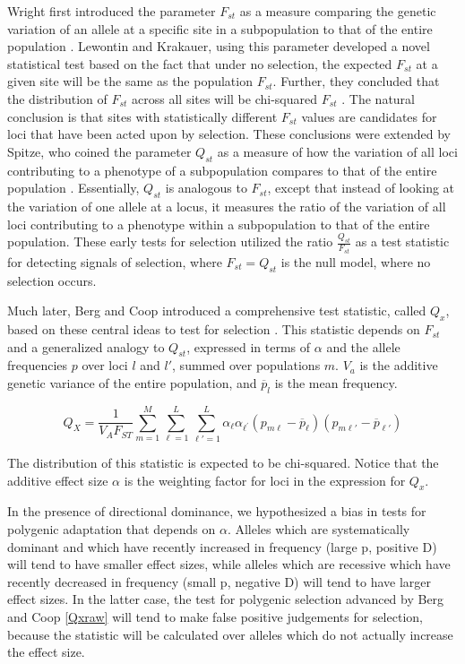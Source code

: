 \documentclass[a4paper,11pt]{article}
\begin{document}
Wright first introduced the parameter $F_{st}$ as a measure comparing
the genetic variation of an allele at a specific site in a subpopulation to that of the entire population
\cite{Fst}. Lewontin and Krakauer, using this parameter developed a
novel statistical test based on the fact
that under no selection, the expected $F_{st}$ at a given site will be the same
as the population $F_{st}$. Further, they concluded that the
distribution of $F_{st}$ across all sites will be chi-squared
$F_{st}$ \cite{firstseltest}. The natural conclusion is that sites
with statistically different $F_{st}$ values are candidates for loci
that have been acted upon by selection. These conclusions were extended by Spitze, who coined the
parameter $Q_{st}$ as a measure of how the variation of all loci
contributing to a phenotype of a subpopulation compares to that of the entire
population \cite{Qst}. Essentially, $Q_{st}$ is analogous to $F_{st}$,
except that instead of looking at the variation of one allele at a
locus, it measures the ratio of the variation of all loci contributing to a
phenotype within a subpopulation to that of the entire population. These early tests for selection utilized the ratio
$\frac{Q_{st}}{F_{st}}$ as a test statistic for detecting signals of
selection, where $F_{st} = Q_{st}$ is the null model, where no
selection occurs.

Much later, Berg and Coop introduced a comprehensive test statistic,
called $Q_x$, based on these central ideas to test
for selection \cite{berg}. This statistic depends on $F_{st}$ and
a generalized analogy to $Q_{st}$, expressed in terms of $\alpha$ and
the allele frequencies $p$ over loci $l$ and $l'$, summed over
populations $m$. $V_a$ is the additive genetic variance of the entire
population, and $\overline{p}_l$ is the mean frequency.

\begin{equation} \label{Qxraw}
  Q_X = \frac{1}{V_A F_{ST}} \sum_{m=1}^M \sum_{\ell=1}^L \sum_{\ell\prime=1}^L \alpha_{\ell} \alpha_{\ell^{\prime}}\left(p_{m\ell} - \overline{p}_\ell \right)\left(p_{m \ell\prime} - \overline{p}_{\ell\prime}\right)
\end{equation}


The distribution of this statistic is expected to be chi-squared. Notice that the additive effect size $\alpha$ is the weighting factor for loci in the
expression for $Q_x$. 

In the presence of directional dominance, we hypothesized a bias in
tests for polygenic adaptation that depends on $\alpha$. Alleles which are systematically dominant and which have recently increased in
frequency (large p, positive D) will tend to have smaller effect sizes, while
alleles which are recessive which have recently decreased in frequency
(small p, negative D) will tend to have larger effect sizes. In the
latter case, the test for polygenic selection advanced by Berg and Coop
\eqref{Qxraw} will tend to make false positive judgements for
selection, because the statistic will be calculated over alleles which
do not actually increase the effect size.
\end{document}
